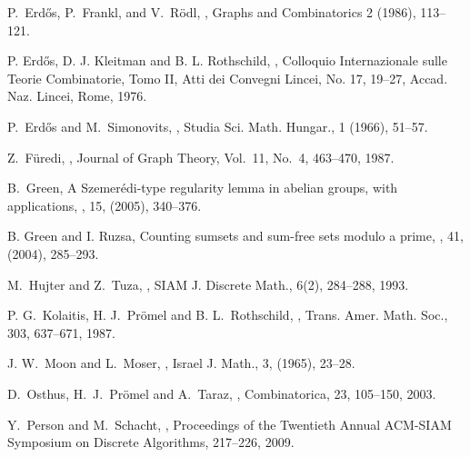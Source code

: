 \documentclass[12pt]{article}
\theoremstyle{definition}
\theoremstyle{definition}
\theoremstyle{definition}
\theoremstyle{definition}
\theoremstyle{definition}
\theoremstyle{definition}
\theoremstyle{definition}
\newcommand{\3}{\bf{3}}
\begin{document}
\begin{thebibliography}{99}
P.~Erd\H{o}s, P.~Frankl, and V.~R\"{o}dl, , \newblock Graphs and Combinatorics 2 (1986), 113--121.

P. Erd\H{o}s, D. J. Kleitman and B. L. Rothschild, , \newblock Colloquio Internazionale sulle Teorie Combinatorie, Tomo II, Atti dei Convegni Lincei, No. 17, 19--27, Accad. Naz. Lincei, Rome, 1976.


 P.~Erd\H{o}s and M.~Simonovits,
 , \newblock Studia Sci. Math. Hungar., 1 (1966), 51--57.

Z.~F\"uredi, ,  \newblock Journal of Graph Theory, Vol.~11, No.~4, 463--470, 1987.

B.~Green,
\newblock A {S}zemer\'edi-type regularity lemma in abelian groups, with
              applications,
, 15, (2005), 340--376. 

B. Green and I. Ruzsa,
\newblock
Counting sumsets and sum-free sets modulo a prime,
, 41, (2004), 285--293. 

 M.~Hujter and Z.~Tuza,  
, 
 \newblock SIAM J. Discrete Math., 6(2), 284--288, 1993.
  
 P. G.~Kolaitis, H. J.~Pr\"omel and B. L.~Rothschild, 
, 
\newblock Trans. Amer. Math. Soc., 303, 637--671, 1987.

J. W.~Moon and L.~Moser,
,
\newblock  Israel J. Math., 3, (1965), 23--28.

 D.~Osthus, H.~J.~Pr\"omel and A.~Taraz, 
, 
\newblock Combinatorica, 23, 105--150, 2003.

Y.~Person and M.~Schacht, 
, 
\newblock Proceedings of the {T}wentieth {A}nnual {ACM}-{SIAM}
              {S}ymposium on {D}iscrete {A}lgorithms, 217--226, 2009.


\end{thebibliography}
\end{document}
